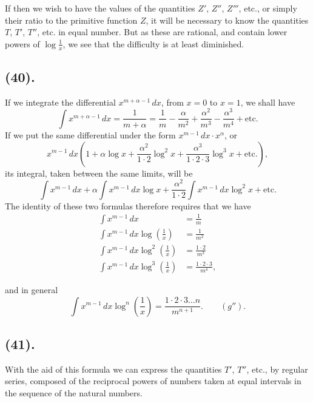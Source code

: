 \documentclass{article}
\begin{document}
If then we wish to have the values of the quantities $Z'$, $Z''$, $Z'''$, etc., or simply their ratio to the primitive function $Z$, it will be necessary to know the quantities $T$, $T'$, $T''$, etc. in equal number. But as these are rational, and contain lower powers of $\log\frac{1}{x}$, we see that the difficulty is at least diminished.

\subsection*{(40).}

If we integrate the differential $x^{m+\alpha-1}\,dx$, from $x=0$ to $x=1$, we shall have
\[ \int x^{m+\alpha-1}\,dx=\frac{1}{m+\alpha}=\frac{1}{m}-\frac{\alpha}{m^{2}}+\frac{\alpha^{2}}{m^{3}}-\frac{\alpha^{3}}{m^{4}}+\text{etc.} \]
If we put the same differential under the form $x^{m-1}\,dx\cdot x^{\alpha}$, or
\[ x^{m-1}\,dx\left(1+\alpha\log x+\frac{\alpha^{2}}{1\cdot 2}\log^{2}x+\frac{\alpha^{3}}{1\cdot 2\cdot 3}\log^{3}x+\text{etc.}\right), \]
its integral, taken between the same limits, will be
\[ \int x^{m-1}\,dx+\alpha\int x^{m-1}\,dx\log x+\frac{\alpha^{2}}{1\cdot 2}\int x^{m-1}\,dx\log^{2}x+\text{etc.} \]
The identity of these two formulas therefore requires that we have
\[ \begin{aligned} \int x^{m-1}\,dx&=\frac{1}{m}\\ \int x^{m-1}\,dx\log\left(\frac{1}{x}\right)&=\frac{1}{m^{2}}\\ \int x^{m-1}\,dx\log^{2}\left(\frac{1}{x}\right)&=\frac{1\cdot 2}{m^{3}}\\ \int x^{m-1}\,dx\log^{3}\left(\frac{1}{x}\right)&=\frac{1\cdot 2\cdot 3}{m^{4}}, \end{aligned} \]

and in general
\[ \int x^{m-1}\,dx\log^{n}\left(\frac{1}{x}\right)=\frac{1\cdot 2\cdot 3\ldots n}{m^{n+1}}.\qquad(g''). \]

\subsection*{(41).}

With the aid of this formula we can express the quantities $T'$, $T''$, etc., by regular series, composed of the reciprocal powers of numbers taken at equal intervals in the sequence of the natural numbers.
\end{document}
